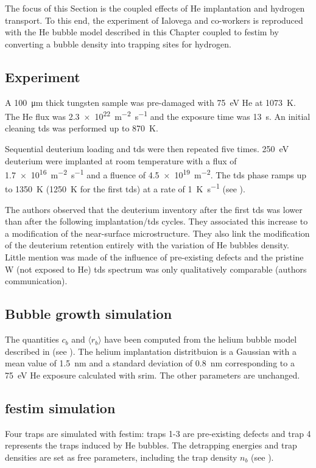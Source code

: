 The focus of this Section is the coupled effects of \gls{He} implantation and hydrogen transport.
To this end, the experiment of Ialovega and co-workers  is reproduced with the \gls{He} bubble model described in this Chapter coupled to \gls{festim} by converting a bubble density into trapping sites for hydrogen.

\subsection{Experiment}

A \SI{100}{\micro\metre} thick tungsten sample was pre-damaged with \SI{75}{eV} He at \SI{1073}{K}.
The \gls{He} flux was \SI{2.3e22}{m^{-2}.s^{-1}} and the exposure time was \SI{13}{s}.
An initial cleaning \gls{tds} was performed up to \SI{870}{K}.

Sequential deuterium loading and \gls{tds} were then repeated five times.
\SI{250}{eV} deuterium were implanted at room temperature with a flux of \SI{1.7e16}{m^{-2}.s^{-1}} and a \gls{fluence} of \SI{4.5e19}{m^{-2}}.
The \gls{tds} phase ramps up to \SI{1350}{K} (\SI{1250}{K} for the first \gls{tds}) at a rate of \SI{1}{K.s^{-1}} (see ).

The authors observed that the deuterium inventory after the first \gls{tds} was lower than after the following implantation/\gls{tds} cycles.
They associated this increase to a modification of the near-surface microstructure.
They also link the modification of the deuterium retention entirely with the variation of \gls{He} bubbles density.
Little mention was made of the influence of pre-existing defects and the pristine \gls{W} (not exposed to \gls{He}) \gls{tds} spectrum was only qualitatively comparable (authors communication).

\subsection{Bubble growth simulation}
The quantities $c_b$ and $\langle r_b \rangle$ have been computed from the helium bubble model described in  (see ).
The helium implantation distritbuion is a Gaussian with a mean value of \SI{1.5}{nm} and a standard deviation of \SI{0.8}{nm} corresponding to a \SI{75}{eV} He exposure calculated with \gls{srim}.
The other parameters are unchanged.

\subsection{\gls{festim} simulation}
Four traps are simulated with \gls{festim}: traps 1-3 are pre-existing defects and trap 4 represents the traps induced by \gls{He} bubbles.
The detrapping energies and trap densities are set as free parameters, including the trap density $n_b$ (see ).

